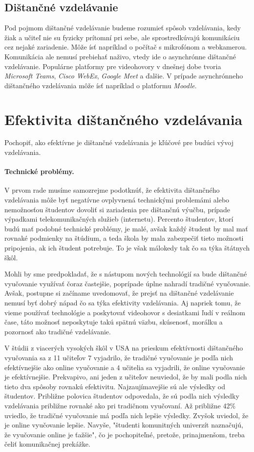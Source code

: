 \documentclass[10pt,twoside,slovak,a4paper]{article}
\begin{document}
\subsection{Dištančné vzdelávanie}
Pod pojmom dištančné vzdelávanie budeme rozumieť spôsob vzdelávania, kedy žiak a učiteľ nie su fyzicky prítomní pri sebe, ale sprostredkúvajú komunikáciu cez nejaké zariadenie. Môže ísť napríklad o počítač s mikrofónom a webkamerou. Komunikácia ale nemusí prebiehať naživo, vtedy ide o asynchrónne dištančné vzdelávanie. Populárne platformy pre videohovory v dnešnej dobe tvoria \textit{Microsoft Teams}, \textit{Cisco WebEx}, \textit{Google Meet} a ďalšie. V prípade asynchrónneho dištančného vzdelávania môže ísť napríklad o platformu \textit{Moodle}.

\section{Efektivita dištančného vzdelávania} \label{efektivita}
Pochopiť, ako efektívne je dištančné vzdelávania je kľúčové pre budúci vývoj vzdelávania.

\paragraph{Technické problémy.}
V prvom rade musíme samozrejme podotknúť, že efektivita dištančného vzdelávania môže byť negatívne ovplyvnená technickými problemámi alebo nemožnosťou študentov dovoliť si zariadenia pre dištančnú výučbu, prípade výpadkami telekomunikačných služieb (internetu). Percento študentov, ktorí budú mať podobné technické problémy, je malé, avšak každý študent by mal mať rovnaké podmienky na štúdium, a teda škola by mala zabezpečiť tieto možnosti pripojenia, ak ich študent potrebuje. To je však málokedy tak čo sa týka štátnych škôl.

Mohli by sme predpokladať, že s nástupom nových technológií sa bude dištančné vyučovanie využívať čoraz častejšie, poprípade úplne nahradí tradičné vyučovanie. Avšak, postupne si začíname uvedomovať, že prejsť na dištančné vzdelávanie nemusí byť dobrý nápad čo sa týka efektivity vzdelávania. Aj napriek tomu, že vieme používať technológie a poskytovať videohovor s desiatkami ľudí v reálnom čase, táto možnosť neposkytuje takú spätnú väzbu, skúsenosť, morálku a pozornosť ako tradičné vzdelávanie.

V štúdii z viacerých vysokých škôl v USA na prieskum efektívnosti dištančného vyučovania sa z 11 učiteľov 7 vyjadrilo, že tradičné vyučovanie je podľa nich efektívnejšie ako online vyučovanie a 4 učitelia sa vyjadrili, že online vyučovanie je efektívnejšie. Prekvapivo, ani jeden z učiteľov neuviedol, že by mali podla nich tieto dva spôsoby rovnakú efektivitu. Najzaujímavejšie sú ale výsledky od študentov. Približne polovica študentov odpovedala, že sú podla nich výsledky vzdelávania približne rovnaké ako pri tradičnom vyučovaní. Až približne 42\% uviedlo, že tradičné vyučovanie má podľa nich lepšie výsledky. Zvyšok uviedol, že je online vyučovanie lepšie. Navyše, "študenti komunitných univerzít naznačujú, že vyučovanie online je ťažšie"\cite{Warren:Effectiveness}, čo je pochopiteľné, pretože, prinajmenšom, treba čeliť komunikačnej prekážke.
\end{document}
